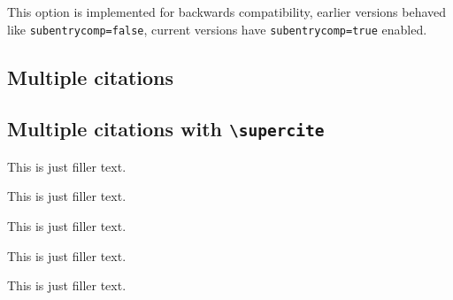 \documentclass[a4paper]{article}
\newcommand{\cmd}[1]{\texttt{\textbackslash #1}}
\begin{document}
This option is implemented for backwards compatibility,
earlier versions behaved like
\texttt{subentrycomp=false}, current versions have
\texttt{subentrycomp=true} enabled.

\subsection*{Multiple citations}

\cite{bertram,augustine}

\cite{murray,bertram,augustine,companion,cotton}

\cite{augustine,bertram,cotton,hammond,set,massa,murray}

\cite{bertram,companion,cotton,augustine,massa,set,hammond,murray,stdmodel}

\cite{yoon,weinberg}

\subsection*{Multiple citations with \cmd{supercite}}

This is just filler text.\supercite{bertram,augustine}

This is just filler text.\supercite{murray,bertram,augustine,companion,cotton}

This is just filler text.\supercite{augustine,bertram,cotton,hammond,set,massa,murray}

This is just filler text.\supercite{bertram,companion,cotton,augustine,massa,set,hammond,murray,stdmodel}

This is just filler text.\supercite{yoon,weinberg}

\clearpage
\printbibliography
\end{document}

